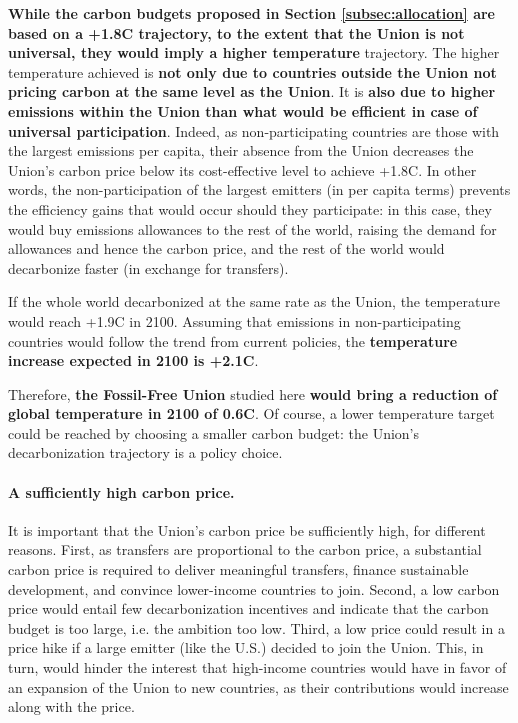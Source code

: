 \documentclass[12pt,english]{article}
\begin{document}
\textbf{While the carbon budgets proposed in Section \ref{subsec:allocation} are based on a +1.8\textdegree{}C trajectory, to the extent that the Union is not universal, they would imply a higher temperature} trajectory. The higher temperature achieved is \textbf{not only due to countries outside the Union not pricing carbon at the same level as the Union}. %
It is \textbf{also due to higher emissions within the Union than what would be efficient in case of universal participation}. Indeed, as non-participating countries are those with the largest emissions per capita, their absence from the Union decreases the Union's carbon price below its cost-effective level to achieve +1.8\textdegree{}C. In other words, the non-participation of the largest emitters (in per capita terms) prevents the efficiency gains that would occur should they participate: in this case, they would buy emissions allowances to the rest of the world, raising the demand for allowances and hence the carbon price, and the rest of the world would decarbonize faster (in exchange for transfers). 

If the whole world decarbonized at the same rate as the Union, the temperature would reach +1.9\textdegree{}C in 2100. Assuming that emissions in non-participating countries would follow the trend from current policies, the \textbf{temperature increase expected in 2100 is +2.1\textdegree{}C}. %

Therefore, \textbf{the Fossil-Free Union} studied here \textbf{would bring a reduction of global temperature in 2100 of 0.6\textdegree{}C}. Of course, a lower temperature target could be reached by choosing a smaller carbon budget: the Union's decarbonization trajectory is a policy choice. %

\paragraph{A sufficiently high carbon price.}
It is important that the Union's carbon price be sufficiently high, for different reasons. First, as transfers are proportional to the carbon price, a substantial carbon price is required to deliver meaningful transfers, finance sustainable development, and convince lower-income countries to join. Second, a low carbon price would entail few decarbonization incentives and indicate that the carbon budget is too large, i.e. the ambition too low. Third, a low price could result in a price hike if a large emitter (like the U.S.) decided to join the Union. This, in turn, would hinder the interest that high-income countries would have in favor of an expansion of the Union to new countries, as their contributions would increase along with the price.
\end{document}
